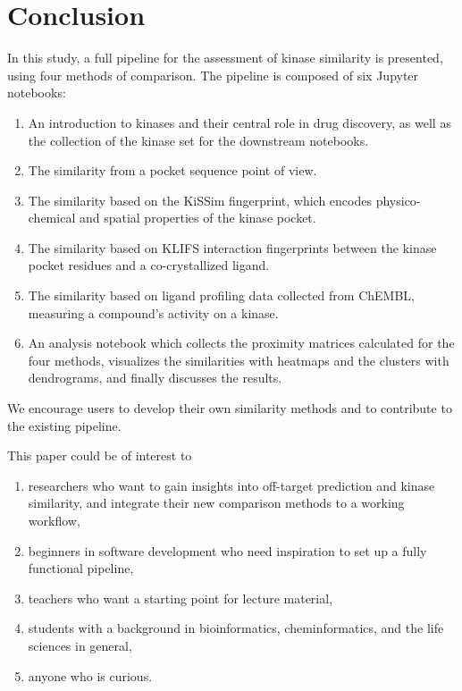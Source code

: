 \documentclass[9pt,training,ASAPversion]{livecoms}
\begin{document}
\section{Conclusion}
In this study, a full pipeline for the assessment of kinase similarity is presented, using four methods of comparison. The pipeline is composed of six Jupyter notebooks:
\begin{enumerate}
    \item An introduction to kinases and their central role in drug discovery, as well as the collection of the kinase set for the downstream notebooks.
    \item The similarity from a pocket sequence point of view.
    \item The similarity based on the KiSSim fingerprint, which encodes physico-chemical and spatial properties of the kinase pocket.
    \item The similarity based on KLIFS interaction fingerprints between the kinase pocket residues and a co-crystallized ligand.
    \item The similarity based on ligand profiling data collected from ChEMBL, measuring a compound's activity on a kinase.
    \item An analysis notebook which collects the proximity matrices calculated for the four methods, visualizes the similarities with heatmaps and the clusters with dendrograms, and finally discusses the results.
\end{enumerate}

We encourage users to develop their own similarity methods and to contribute to the existing pipeline.

This paper could be of interest to
\begin{enumerate}
    \item researchers who want to gain insights into off-target prediction and kinase similarity, and integrate their new comparison methods to a working workflow,
    \item beginners in software development who need inspiration to set up a fully functional pipeline,
    \item teachers who want a starting point for lecture material,
    \item students with a background in bioinformatics, cheminformatics, and the life sciences in general,
    \item anyone who is curious.
\end{enumerate}
\end{document}
